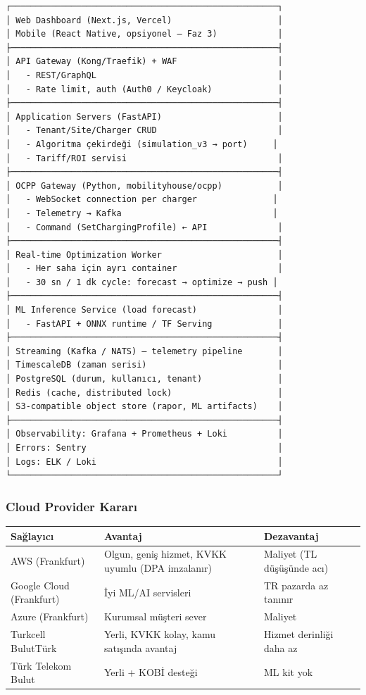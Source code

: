 \documentclass[11pt,a4paper]{article}
\begin{document}
\begin{lstlisting}[basicstyle=\small\ttfamily, frame=single]
┌─────────────────────────────────────────────────────┐
│ Web Dashboard (Next.js, Vercel)                     │
│ Mobile (React Native, opsiyonel — Faz 3)            │
├─────────────────────────────────────────────────────┤
│ API Gateway (Kong/Traefik) + WAF                    │
│   - REST/GraphQL                                    │
│   - Rate limit, auth (Auth0 / Keycloak)             │
├─────────────────────────────────────────────────────┤
│ Application Servers (FastAPI)                       │
│   - Tenant/Site/Charger CRUD                        │
│   - Algoritma çekirdeği (simulation_v3 → port)     │
│   - Tariff/ROI servisi                              │
├─────────────────────────────────────────────────────┤
│ OCPP Gateway (Python, mobilityhouse/ocpp)           │
│   - WebSocket connection per charger               │
│   - Telemetry → Kafka                              │
│   - Command (SetChargingProfile) ← API              │
├─────────────────────────────────────────────────────┤
│ Real-time Optimization Worker                       │
│   - Her saha için ayrı container                    │
│   - 30 sn / 1 dk cycle: forecast → optimize → push │
├─────────────────────────────────────────────────────┤
│ ML Inference Service (load forecast)                │
│   - FastAPI + ONNX runtime / TF Serving             │
├─────────────────────────────────────────────────────┤
│ Streaming (Kafka / NATS) — telemetry pipeline       │
│ TimescaleDB (zaman serisi)                          │
│ PostgreSQL (durum, kullanıcı, tenant)               │
│ Redis (cache, distributed lock)                     │
│ S3-compatible object store (rapor, ML artifacts)    │
├─────────────────────────────────────────────────────┤
│ Observability: Grafana + Prometheus + Loki          │
│ Errors: Sentry                                      │
│ Logs: ELK / Loki                                    │
└─────────────────────────────────────────────────────┘
\end{lstlisting}

\subsubsection{Cloud Provider Kararı}

\begin{tabularx}{\textwidth}{l X X}
\toprule
\textbf{Sağlayıcı} & \textbf{Avantaj} & \textbf{Dezavantaj} \\
\midrule
AWS (Frankfurt) & Olgun, geniş hizmet, KVKK uyumlu (DPA imzalanır) & Maliyet (TL düşüşünde acı) \\
Google Cloud (Frankfurt) & İyi ML/AI servisleri & TR pazarda az tanınır \\
Azure (Frankfurt) & Kurumsal müşteri sever & Maliyet \\
Turkcell BulutTürk & Yerli, KVKK kolay, kamu satışında avantaj & Hizmet derinliği daha az \\
Türk Telekom Bulut & Yerli + KOBİ desteği & ML kit yok \\
\bottomrule
\end{tabularx}
\end{document}
